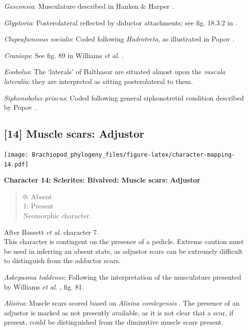\documentclass[openany]{book}
\theoremstyle{definition}
\theoremstyle{definition}
\theoremstyle{definition}
\theoremstyle{remark}
\begin{document}
\emph{Gasconsia}: Musculature described in Hanken \& Harper
\citeyearpar{Hanken1985Thetaxonomy}.

\emph{Glyptoria}: Posterolateral reflected by diductor attachments; see
fig. 18.3.2 in \citet{Bassett2001Functionalmorphology}.

\emph{Clupeafumosus socialis}: Coded following \emph{Hadrotreta}, as
illustrated in Popov \citeyearpar{Popov1992TheCambrian}.

\emph{Craniops}: See fig. 89 in Williams \emph{et al}.
\citeyearpar{Williams2000BrachiopodaLinguliformea}.

\emph{Eoobolus}: The `laterals' of Balthasar \citeyearpar[fig.
5]{Balthasar2009Thebrachiopod} are situated almost upon the
\emph{vascula} \emph{lateralia}; they are interpreted as sitting
posterolateral to them.

\emph{Siphonobolus priscus}: Coded following general siphonotretid
condition described by Popov \citeyearpar[p.~407]{Popov1992TheCambrian}.

\hypertarget{muscle-scars-adjustor}{%
\subsection*{{[}14{]} Muscle scars:
Adjustor}\label{muscle-scars-adjustor}}

\texttt{[image: Brachiopod\_phylogeny\_files/figure-latex/character-mapping-14.pdf]}

\textbf{Character 14: Sclerites: Bivalved: Muscle scars: Adjustor}

\begin{quote}
0: Absent\\
1: Present\\
Neomorphic character.
\end{quote}

After Bassett \emph{et al}.
\citeyearpar{Bassett2001Functionalmorphology} character 7.\\
This character is contingent on the presence of a pedicle. Extreme
caution must be used in inferring an absent state, as adjustor scars can
be extremely difficult to distinguish from the adductor scars.

\emph{Askepasma toddense}: Following the interpretation of the
musculature presented by Williams \emph{et al}.
\citeyearpar{Williams2000BrachiopodaLinguliformea}, fig. 81.

\emph{Alisina}: Muscle scars scored based on \emph{Alisina}
\emph{comleyensis} \citep{Bassett2001Functionalmorphology}. The presence
of an adjustor is marked as not presently available, as it is not clear
that a scar, if present, could be distinguished from the diminutive
muscle scars present.
\end{document}
